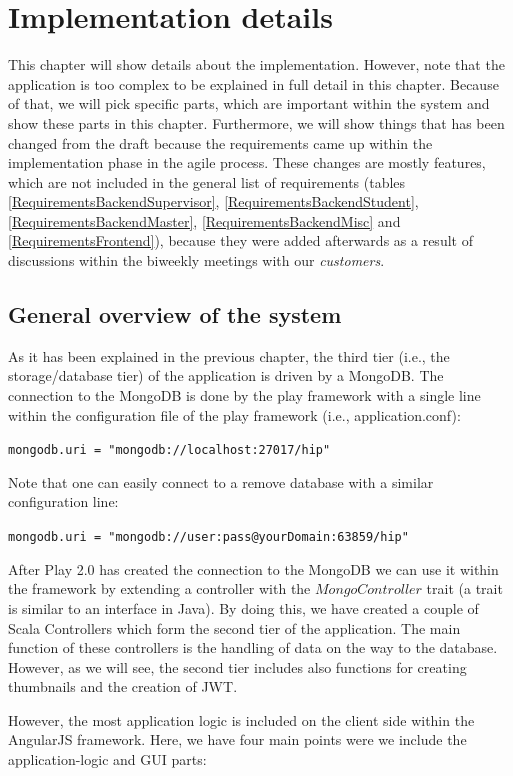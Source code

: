 \chapter[Implementation details]{Implementation details}
\label{implementation}

This chapter will show details about the implementation. However, note that the application is too complex to be explained in full detail in this chapter. Because of that, we will pick specific parts, which are important within the system and show these parts in this chapter.
Furthermore, we will show things that has been changed from the draft because the requirements came up within the implementation phase in the agile process. These changes are mostly features, which are not included in the general list of requirements (tables \ref{RequirementsBackendSupervisor}, \ref{RequirementsBackendStudent}, \ref{RequirementsBackendMaster}, \ref{RequirementsBackendMisc} and \ref{RequirementsFrontend}), because they were added afterwards as a result of discussions within the biweekly meetings with our \emph{customers}.

\section{General overview of the system}
As it has been explained in the previous chapter, the third tier (i.e., the storage/database tier) of the application is driven by a MongoDB. The connection to the MongoDB is done by the play framework with a single line within the configuration file of the play framework (i.e., application.conf):

\verb|mongodb.uri = "mongodb://localhost:27017/hip"|

Note that one can easily connect to a remove database with a similar configuration line:

\verb|mongodb.uri = "mongodb://user:pass@yourDomain:63859/hip"|  

After Play 2.0 has created the connection to the MongoDB we can use it within the framework by extending a controller with the $MongoController$ trait (a trait is similar to an interface in Java). By doing this, we have created a couple of Scala Controllers which form the second tier of the application. The main function of these controllers is the handling of data on the way to the database. However, as we will see, the second tier includes also functions for creating thumbnails and the creation of \ac{JWT}. 

However, the most application logic is included on the client side within the AngularJS framework. Here, we have four main points were we include the application-logic and \ac{GUI} parts:

